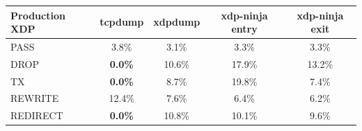 \begin{tabular}{@{}l c c c c@{}}
\toprule
Production XDP & tcpdump & xdpdump & xdp-ninja entry & xdp-ninja exit \\
\midrule
PASS & 3.8\% & 3.1\% & 3.3\% & 3.3\% \\
DROP & \textbf{0.0\%} & 10.6\% & 17.9\% & 13.2\% \\
TX & \textbf{0.0\%} & 8.7\% & 19.8\% & 7.4\% \\
REWRITE & 12.4\% & 7.6\% & 6.4\% & 6.2\% \\
REDIRECT & \textbf{0.0\%} & 10.8\% & 10.1\% & 9.6\% \\
\bottomrule
\end{tabular}
